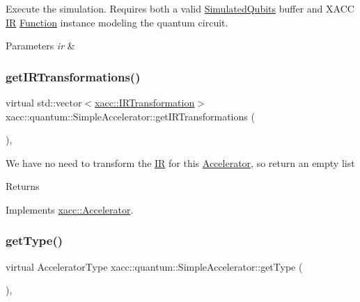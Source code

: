 Execute the simulation. Requires both a valid \hyperlink{a01248}{Simulated\+Qubits} buffer and X\+A\+CC \hyperlink{a02480}{IR} \hyperlink{a02456}{Function} instance modeling the quantum circuit.


\begin{DoxyParams}{Parameters}
{\em ir} & \\
\hline
\end{DoxyParams}
\mbox{\label{a01244_afc49c9e7973ba6c6ff9761c36198323d}} 
\subsubsection{\texorpdfstring{get\+I\+R\+Transformations()}{getIRTransformations()}}
{\footnotesize\ttfamily virtual std\+::vector$<$\hyperlink{a02484}{xacc\+::\+I\+R\+Transformation}$>$ xacc\+::quantum\+::\+Simple\+Accelerator\+::get\+I\+R\+Transformations (\begin{DoxyParamCaption}{ }\end{DoxyParamCaption})\hspace{0.3cm}{\ttfamily [inline]}, {\ttfamily [virtual]}}

We have no need to transform the \hyperlink{a02480}{IR} for this \hyperlink{a02432}{Accelerator}, so return an empty list \begin{DoxyReturn}{Returns}

\end{DoxyReturn}


Implements \hyperlink{a02432_ad6e4a642dcb24e552675bcbeff1e1b04}{xacc\+::\+Accelerator}.

\mbox{\label{a01244_ad76eeb0bbd7de21aad5bd20d20970a98}} 
\subsubsection{\texorpdfstring{get\+Type()}{getType()}}
{\footnotesize\ttfamily virtual Accelerator\+Type xacc\+::quantum\+::\+Simple\+Accelerator\+::get\+Type (\begin{DoxyParamCaption}{ }\end{DoxyParamCaption})\hspace{0.3cm}{\ttfamily [inline]}, {\ttfamily [virtual]}}

